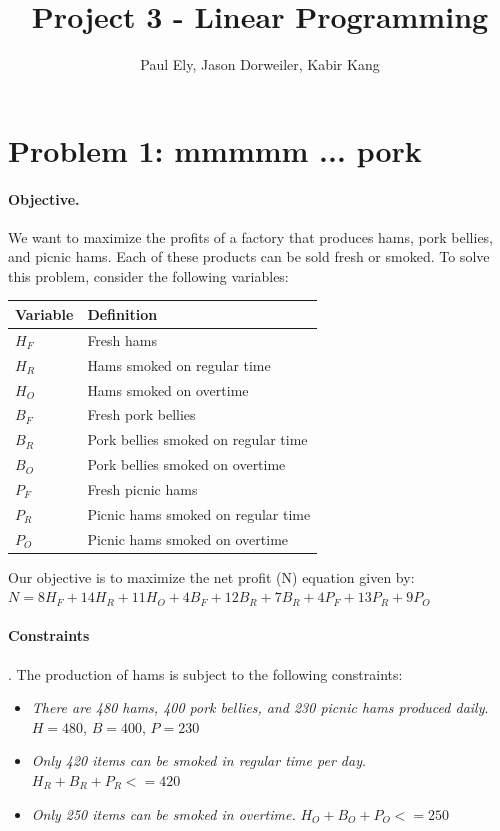 \documentclass[11pt,letterpaper]{article}
\author{Paul Ely, Jason Dorweiler, Kabir Kang}
\title{Project 3 - Linear Programming}
\begin{document}
\maketitle

\section*{Problem 1: mmmmm ... pork}

\paragraph{Objective.} We want to maximize the profits of a factory that produces hams, pork bellies, and picnic hams. Each of these products can be sold fresh or smoked. To solve this problem, consider the following variables: \\

\begin{tabular}{ll}
Variable & Definition \\
\hline
$H_F$ & Fresh hams \\
$H_R$ & Hams smoked on regular time \\
$H_O$ & Hams smoked on overtime \\
$B_F$ & Fresh pork bellies \\
$B_R$ & Pork bellies smoked on regular time \\
$B_O$ & Pork bellies smoked on overtime \\
$P_F$ & Fresh picnic hams \\
$P_R$ & Picnic hams smoked on regular time \\
$P_O$ & Picnic hams smoked on overtime \\
\end{tabular}

Our objective is to maximize the net profit (N) equation given by:
$N = 8 H_F + 14 H_R + 11 H_O + 4 B_F + 12 B_R + 7 B_R + 4 P_F + 13 P_R + 9 P_O$

\paragraph{Constraints}. The production of hams is subject to the following constraints:

\begin{itemize}
\item[] \textit{There are 480 hams, 400 pork bellies, and 230 picnic hams produced daily}. $H = 480$, $B = 400$, $P = 230$
\item[] \textit{Only 420 items can be smoked in regular time per day}. $H_R + B_R + P_R <= 420$
\item[] \textit{Only 250 items can be smoked in overtime.} $H_O + B_O + P_O <= 250$
\end{itemize}
\end{document}
